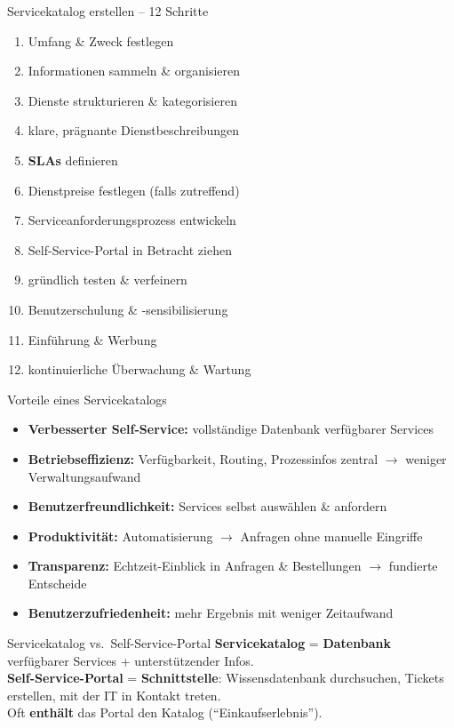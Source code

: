 \documentclass[a4paper, fontsize=7pt]{scrartcl}
\begin{document}
\begin{mainbox}{Servicekatalog erstellen -- 12 Schritte}
\begin{enumerate}
    \item Umfang \& Zweck festlegen
    \item Informationen sammeln \& organisieren
    \item Dienste strukturieren \& kategorisieren
    \item klare, prägnante Dienstbeschreibungen
    \item \textbf{SLAs} definieren
    \item Dienstpreise festlegen (falls zutreffend)
    \item Serviceanforderungsprozess entwickeln
    \item Self-Service-Portal in Betracht ziehen
    \item gründlich testen \& verfeinern
    \item Benutzerschulung \& -sensibilisierung
    \item Einführung \& Werbung
    \item kontinuierliche Überwachung \& Wartung
\end{enumerate}
\end{mainbox}

\begin{mainbox}{Vorteile eines Servicekatalogs}
\begin{itemize}
    \item \textbf{Verbesserter Self-Service:} vollständige Datenbank
          verfügbarer Services
    \item \textbf{Betriebseffizienz:} Verfügbarkeit, Routing,
          Prozessinfos zentral $\to$ weniger Verwaltungsaufwand
    \item \textbf{Benutzerfreundlichkeit:} Services selbst auswählen \&
          anfordern
    \item \textbf{Produktivität:} Automatisierung $\to$ Anfragen ohne
          manuelle Eingriffe
    \item \textbf{Transparenz:} Echtzeit-Einblick in Anfragen \&
          Bestellungen $\to$ fundierte Entscheide
    \item \textbf{Benutzerzufriedenheit:} mehr Ergebnis mit weniger
          Zeitaufwand
\end{itemize}
\end{mainbox}

\begin{mainbox}{Servicekatalog vs.\ Self-Service-Portal}
\textbf{Servicekatalog} = \textbf{Datenbank} verfügbarer Services +
unterstützender Infos.\\
\textbf{Self-Service-Portal} = \textbf{Schnittstelle}: Wissensdatenbank
durchsuchen, Tickets erstellen, mit der IT in Kontakt treten.\\
Oft \textbf{enthält} das Portal den Katalog (``Einkaufserlebnis'').
\end{mainbox}
\end{document}
